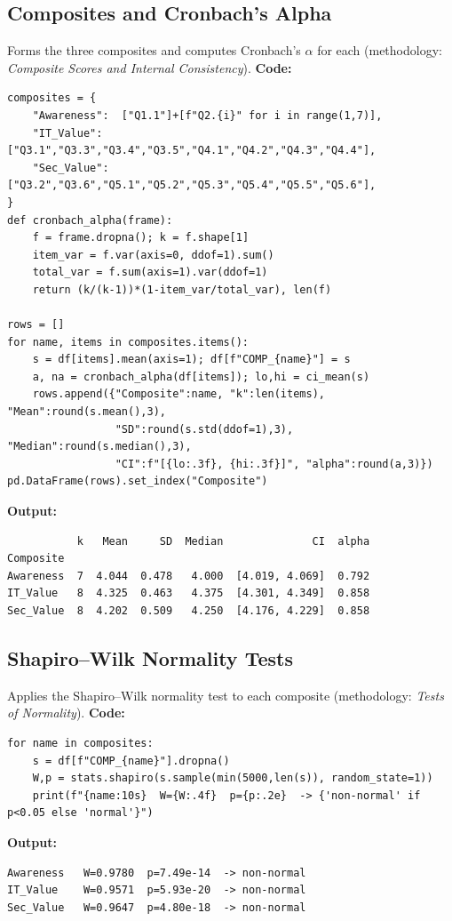 \subsection{Composites and Cronbach's Alpha}
Forms the three composites and computes Cronbach's $\alpha$ for each (methodology: \emph{Composite Scores and Internal Consistency}).
\noindent\textbf{Code:}\nopagebreak
{\scriptsize\begin{verbatim}
composites = {
    "Awareness":  ["Q1.1"]+[f"Q2.{i}" for i in range(1,7)],
    "IT_Value":   ["Q3.1","Q3.3","Q3.4","Q3.5","Q4.1","Q4.2","Q4.3","Q4.4"],
    "Sec_Value":  ["Q3.2","Q3.6","Q5.1","Q5.2","Q5.3","Q5.4","Q5.5","Q5.6"],
}
def cronbach_alpha(frame):
    f = frame.dropna(); k = f.shape[1]
    item_var = f.var(axis=0, ddof=1).sum()
    total_var = f.sum(axis=1).var(ddof=1)
    return (k/(k-1))*(1-item_var/total_var), len(f)

rows = []
for name, items in composites.items():
    s = df[items].mean(axis=1); df[f"COMP_{name}"] = s
    a, na = cronbach_alpha(df[items]); lo,hi = ci_mean(s)
    rows.append({"Composite":name, "k":len(items), "Mean":round(s.mean(),3),
                 "SD":round(s.std(ddof=1),3), "Median":round(s.median(),3),
                 "CI":f"[{lo:.3f}, {hi:.3f}]", "alpha":round(a,3)})
pd.DataFrame(rows).set_index("Composite")
\end{verbatim}}
\noindent\textbf{Output:}\nopagebreak
{\scriptsize\begin{verbatim}
           k   Mean     SD  Median              CI  alpha
Composite                                                
Awareness  7  4.044  0.478   4.000  [4.019, 4.069]  0.792
IT_Value   8  4.325  0.463   4.375  [4.301, 4.349]  0.858
Sec_Value  8  4.202  0.509   4.250  [4.176, 4.229]  0.858
\end{verbatim}}

\subsection{Shapiro--Wilk Normality Tests}
Applies the Shapiro--Wilk normality test to each composite (methodology: \emph{Tests of Normality}).
\noindent\textbf{Code:}\nopagebreak
{\scriptsize\begin{verbatim}
for name in composites:
    s = df[f"COMP_{name}"].dropna()
    W,p = stats.shapiro(s.sample(min(5000,len(s)), random_state=1))
    print(f"{name:10s}  W={W:.4f}  p={p:.2e}  -> {'non-normal' if p<0.05 else 'normal'}")
\end{verbatim}}
\noindent\textbf{Output:}\nopagebreak
{\scriptsize\begin{verbatim}
Awareness   W=0.9780  p=7.49e-14  -> non-normal
IT_Value    W=0.9571  p=5.93e-20  -> non-normal
Sec_Value   W=0.9647  p=4.80e-18  -> non-normal
\end{verbatim}}

